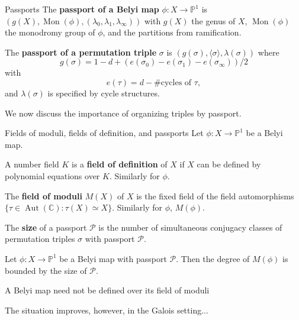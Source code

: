 \documentclass[xcolor=dvipsnames,handout]{beamer}
\theoremstyle{plain}
\newcommand{\PP}{\mathbb P}
\newcommand{\CC}{\mathbb C}
\DeclareMathOperator{\Aut}{Aut}
\DeclareMathOperator{\Mon}{Mon}
\begin{document}
{\begin{frame}{Passports}
      The \textbf{passport of a Belyi map} $\phi:X\to\PP^1$
      is $(g(X), \Mon(\phi), (\lambda_0,\lambda_1,\lambda_\infty))$
      with $g(X)$ the genus of $X$,
      $\Mon(\phi)$ the monodromy group of $\phi$,
      and the partitions from ramification.
      \pause
      \par
      The \textbf{passport of a permutation triple} $\sigma$ is
      $(g(\sigma), \langle\sigma\rangle, \lambda(\sigma))$
      where
      $$
      g(\sigma) = 1-d+(e(\sigma_0)-e(\sigma_1)-e(\sigma_\infty))/2
      $$
      with
      $$
      e(\tau) = d-\#\text{cycles of }\tau,
      $$
      and $\lambda(\sigma)$ is specified by cycle structures.
      \pause
      \par
      We now discuss the importance of organizing triples by passport.
    \end{frame}
    \begin{frame}{Fields of moduli, fields of definition, and passports}
      Let $\phi\colon X\to\PP^1$ be a Belyi map.
      \pause\par
      A number field $K$ is a
      \textbf{field of definition} of $X$
      if $X$ can be defined by polynomial
      equations over $K$.
      Similarly for $\phi$.
      \pause\par
      The \textbf{field of moduli}
      $M(X)$
      of $X$ is
      the fixed field of the field
      automorphisms
      $\{\tau\in\Aut(\CC) : \tau(X)\simeq X\}$.
      Similarly for $\phi$, $M(\phi)$.
      \pause\par
      The \textbf{size} of a passport $\mathcal{P}$
      is the number of simultaneous conjugacy classes
      of permutation triples $\sigma$ with passport
      $\mathcal{P}$.
      \pause
      \begin{theorem}
        Let $\phi\colon X\to\PP^1$ be a
        Belyi map with passport $\mathcal{P}$.
        Then the degree of $M(\phi)$ is
        bounded by the size of $\mathcal{P}$.
      \end{theorem}
      \pause
      A Belyi map need not be defined
      over its field of moduli
      \rWalley
      \pause\par
      The situation improves, however,
      in the Galois setting...
    \end{frame}
}
\end{document}
